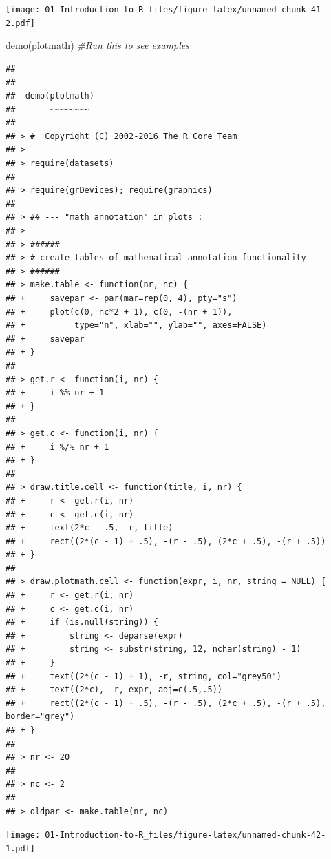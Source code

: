 \documentclass[
]{book}
\newenvironment{Shaded}{\begin{snugshade}}{\end{snugshade}}
\newcommand{\CommentTok}[1]{\textcolor[rgb]{0.56,0.35,0.01}{\textit{#1}}}
\newcommand{\FunctionTok}[1]{\textcolor[rgb]{0.00,0.00,0.00}{#1}}
\newcommand{\NormalTok}[1]{#1}
\theoremstyle{definition}
\theoremstyle{definition}
\theoremstyle{definition}
\theoremstyle{definition}
\theoremstyle{remark}
\begin{document}
\texttt{[image: 01-Introduction-to-R\_files/figure-latex/unnamed-chunk-41-2.pdf]}

\begin{Shaded}
\begin{Highlighting}[]
\FunctionTok{demo}\NormalTok{(plotmath) }\CommentTok{\#Run this to see examples}
\end{Highlighting}
\end{Shaded}

\begin{verbatim}
## 
## 
##  demo(plotmath)
##  ---- ~~~~~~~~
## 
## > #  Copyright (C) 2002-2016 The R Core Team
## > 
## > require(datasets)
## 
## > require(grDevices); require(graphics)
## 
## > ## --- "math annotation" in plots :
## > 
## > ######
## > # create tables of mathematical annotation functionality
## > ######
## > make.table <- function(nr, nc) {
## +     savepar <- par(mar=rep(0, 4), pty="s")
## +     plot(c(0, nc*2 + 1), c(0, -(nr + 1)),
## +          type="n", xlab="", ylab="", axes=FALSE)
## +     savepar
## + }
## 
## > get.r <- function(i, nr) {
## +     i %% nr + 1
## + }
## 
## > get.c <- function(i, nr) {
## +     i %/% nr + 1
## + }
## 
## > draw.title.cell <- function(title, i, nr) {
## +     r <- get.r(i, nr)
## +     c <- get.c(i, nr)
## +     text(2*c - .5, -r, title)
## +     rect((2*(c - 1) + .5), -(r - .5), (2*c + .5), -(r + .5))
## + }
## 
## > draw.plotmath.cell <- function(expr, i, nr, string = NULL) {
## +     r <- get.r(i, nr)
## +     c <- get.c(i, nr)
## +     if (is.null(string)) {
## +         string <- deparse(expr)
## +         string <- substr(string, 12, nchar(string) - 1)
## +     }
## +     text((2*(c - 1) + 1), -r, string, col="grey50")
## +     text((2*c), -r, expr, adj=c(.5,.5))
## +     rect((2*(c - 1) + .5), -(r - .5), (2*c + .5), -(r + .5), border="grey")
## + }
## 
## > nr <- 20
## 
## > nc <- 2
## 
## > oldpar <- make.table(nr, nc)
\end{verbatim}

\texttt{[image: 01-Introduction-to-R\_files/figure-latex/unnamed-chunk-42-1.pdf]}
\end{document}
